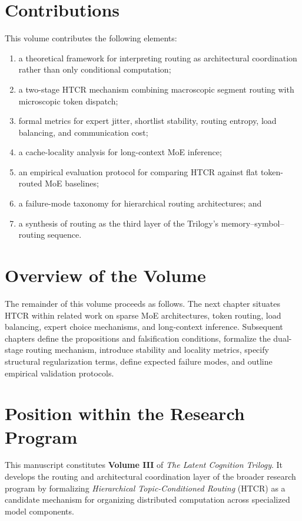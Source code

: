 \section{Contributions}

This volume contributes the following elements:

\begin{enumerate}
    \item a theoretical framework for interpreting routing as architectural coordination rather than only conditional computation;
    \item a two-stage HTCR mechanism combining macroscopic segment routing with microscopic token dispatch;
    \item formal metrics for expert jitter, shortlist stability, routing entropy, load balancing, and communication cost;
    \item a cache-locality analysis for long-context MoE inference;
    \item an empirical evaluation protocol for comparing HTCR against flat token-routed MoE baselines;
    \item a failure-mode taxonomy for hierarchical routing architectures; and
    \item a synthesis of routing as the third layer of the Trilogy's memory--symbol--routing sequence.
\end{enumerate}

\section{Overview of the Volume}

The remainder of this volume proceeds as follows. The next chapter situates HTCR within related work on sparse MoE architectures, token routing, load balancing, expert choice mechanisms, and long-context inference. Subsequent chapters define the propositions and falsification conditions, formalize the dual-stage routing mechanism, introduce stability and locality metrics, specify structural regularization terms, define expected failure modes, and outline empirical validation protocols.

\section*{Position within the Research Program}

This manuscript constitutes \textbf{Volume III} of \textit{The Latent Cognition Trilogy}. It develops the routing and architectural coordination layer of the broader research program by formalizing \textit{Hierarchical Topic-Conditioned Routing} (HTCR) as a candidate mechanism for organizing distributed computation across specialized model components.

